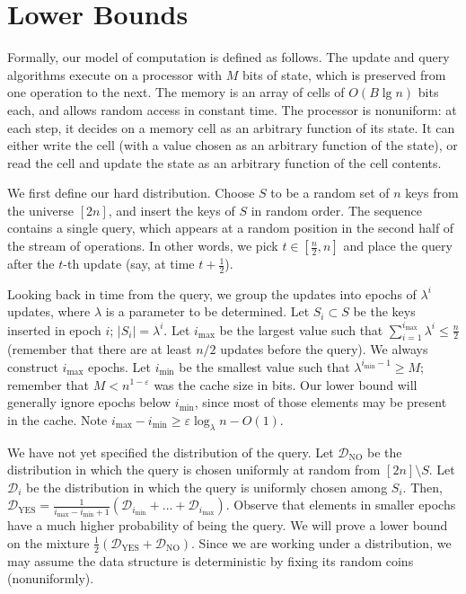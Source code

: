 \documentclass[letterpaper,11pt]{article}
\newcommand{\eps}{\varepsilon}
\newcommand{\calD}{\mathcal{D}}
\newcommand{\Dyes}{\calD_{\mathrm{YES}}}
\newcommand{\Dno}{\calD_{\mathrm{NO}}}
\newcommand{\imax}{{i_{\max}}}
\newcommand{\imin}{{i_{\min}}}
\begin{document}
\section{Lower Bounds}



Formally, our model of computation is defined as follows. The update
and query algorithms execute on a processor with $M$ bits of state,
which is preserved from one operation to the next. The memory is an
array of cells of $O(B\lg n)$ bits each, and allows random access in
constant time. The processor is nonuniform: at each step, it decides
on a memory cell as an arbitrary function of its state. It can either
write the cell (with a value chosen as an arbitrary function of the
state), or read the cell and update the state as an arbitrary function
of the cell contents.

We first define our hard distribution. Choose $S$ to be a random set
of $n$ keys from the universe $[2n]$, and insert the keys of $S$ in
random order. The sequence contains a single query, which appears at a
random position in the second half of the stream of operations. In
other words, we pick $t \in [\frac{n}{2}, n]$ and place the query
after the $t$-th update (say, at time $t + \frac{1}{2}$). 

Looking back in time from the query, we group the updates into epochs
of $\lambda^i$ updates, where $\lambda$ is a parameter to be
determined.  Let $S_i \subset S$ be the keys inserted in epoch $i$;
$|S_i| = \lambda^i$. Let $\imax$ be the largest value such that
$\sum_{i=1}^\imax \lambda^i \le \frac{n}{2}$ (remember that there are
at least $n/2$ updates before the query). We always construct $\imax$
epochs. Let $\imin$ be the smallest value such that $\lambda^{\imin-1}
\ge M$; remember that $M < n^{1-\eps}$ was the cache size in bits. Our
lower bound will generally ignore epochs below $\imin$, since most of
those elements may be present in the cache. Note $\imax - \imin \ge
\eps \log_\lambda n - O(1)$.

We have not yet specified the distribution of the query. Let $\Dno$ be
the distribution in which the query is chosen uniformly at random from
$[2n] \setminus S$.  Let $\calD_i$ be the distribution in which the
query is uniformly chosen among $S_i$. Then, $\Dyes = \frac{1}{\imax -
  \imin + 1} (\calD_\imin + \dots + \calD_\imax)$. Observe that
elements in smaller epochs have a much higher probability of being the
query. We will prove a lower bound on the mixture $\frac{1}{2} (\Dyes
+ \Dno)$. Since we are working under a distribution, we may assume the
data structure is deterministic by fixing its random coins
(nonuniformly).
\end{document}
